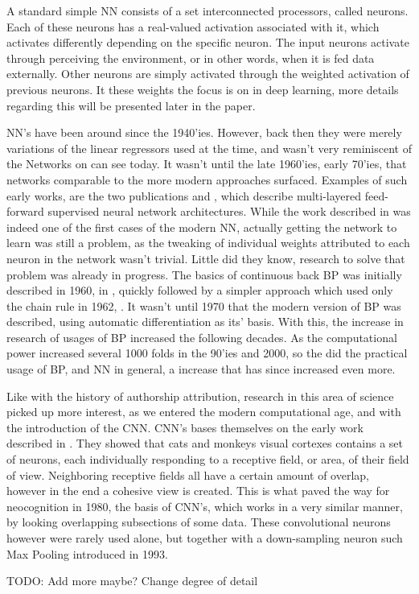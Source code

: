 A standard simple \gls{NN} consists of a set interconnected processors, called
neurons. Each of these neurons has a real-valued activation associated with
it, which activates differently depending on the specific neuron. The input
neurons activate through perceiving the environment, or in other words, when
it is fed data externally. Other neurons are simply activated through the
weighted activation of previous neurons. It these weights the focus is on in
deep learning, more details regarding this will be presented later in the
paper.\cite{DBLP:journals/corr/Schmidhuber14}

\gls{NN}'s have been around since the 1940'ies. However, back then they were
merely variations of the linear regressors used at the time, and wasn't
very reminiscent of the Networks on can see today. It wasn't until the
late 1960'ies, early 70'ies, that networks comparable to the more modern
approaches surfaced. Examples of such early works, are the two publications
\cite{ivakhnenko1973cybernetic} and \cite{4308320}, which describe multi-layered
feed-forward supervised neural network architectures. While the work described
in \cite{4308320} was indeed one of the first cases of the modern \gls{NN},
actually getting the network to learn was still a problem, as the tweaking of
individual weights attributed to each neuron in the network wasn't trivial.
Little did they know, research to solve that problem was already in progress.
The basics of continuous back \gls{BP} was initially described in 1960, in
\cite{Kelley1960}, quickly followed by a simpler approach which used only the
chain rule in 1962, \cite{DREYFUS196230}. It wasn't until 1970 that the modern
version of \gls{BP} was described, using automatic differentiation as its'
basis. With this, the increase in research of usages of \gls{BP} increased the
following decades. As the computational power increased several 1000 folds in
the 90'ies and 2000, so the did the practical usage of \gls{BP}, and \gls{NN} in
general, a increase that has since increased even more. \cite{Schmidhuber:2015}

Like with the history of authorship attribution, research in this area of
science picked up more interest, as we entered the modern computational age,
and with the introduction of the \gls{CNN}. \gls{CNN}'s bases themselves on
the early work described in \cite{TJP:TJP19681951215}. They showed that cats
and monkeys visual cortexes contains a set of neurons, each individually
responding to a receptive field, or area, of their field of view. Neighboring
receptive fields all have a certain amount of overlap, however in the end
a cohesive view is created. This is what paved the way for neocognition
in 1980\cite{Fukushima1980}, the basis of \gls{CNN}'s, which works in a
very similar manner, by looking overlapping subsections of some data. These
convolutional neurons however were rarely used alone, but together with a
down-sampling neuron such Max Pooling introduced in 1993.\cite{Schmidhuber:2015}

TODO: Add more maybe? Change degree of detail

